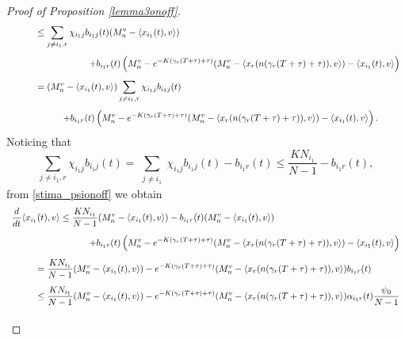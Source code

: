 \documentclass[11pt]{article}
\begin{document}
\begin{proof}[Proof of Proposition \ref{lemma3onoff}]
$$\begin{array}{l}
			\vspace{0.3cm}\displaystyle{\hspace{1cm}\leq \sum_{j \neq i_1 ,r} \chi_{i_1j} b_{i_1j}(t)( M_{n}^v-\langle x_{i_1}(t),v\rangle)}\\
			\vspace{0.3cm}\displaystyle{\hspace{3cm}+b_{i_1r}(t)\left(M_n^v-e^{-K(\gamma_r(T+\tau)+\tau)}(M_n^v-\langle x_r(n(\gamma_r(T+\tau)+\tau)),v \rangle)-\langle x_{i_1}(t),v\rangle\right)}\\
			\vspace{0.3cm}\displaystyle{\hspace{1cm}=( M_{n}^v-\langle x_{i_1}(t),v\rangle)\sum_{j \neq i_1 , r} \chi_{i_1j} b_{i_1j}(t)}\\
			\displaystyle{\hspace{2cm}+ b_{i_1 r}(t)\left(M_n^v-e^{-K(\gamma_r(T+\tau)+\tau)}(M_n^v-\langle x_r(n(\gamma_r(T+\tau)+\tau)),v \rangle)-\langle x_{i_1}(t),v\rangle\right).}
		\end{array}$$
		Noticing that
		$$\sum_{j \neq i_1 ,r} \chi_{i_1j} b_{i_1j}(t)=\sum_{\substack{j \neq i_1 }} \chi_{i_1j} b_{i_1j}(t)-b_{i_1r}(t)\leq \frac{KN_{i_1}}{N-1}-b_{i_1r}(t),$$
		from \eqref{stima_psionoff} we obtain
		$$\begin{array}{l}
			\vspace{0.3cm}\displaystyle{\frac{d}{d t}  \langle x_{i_1}(t),v\rangle \leq \frac{KN_{i_{1}}}{N-1}(M_{n}^v-\langle x_{i_1}(t),v\rangle) -b_{i_1r}(t)(M_{n}^v-\langle x_{i_1}(t),v\rangle) }\\
			\vspace{0.3cm}\displaystyle{\hspace{3cm}+ b_{i_1r}(t)\left(M_n^v-e^{-K(\gamma_r(T+\tau)+\tau)}(M_n^v-\langle x_r(n(\gamma_r(T+\tau)+\tau)),v \rangle)-\langle x_{i_1}(t),v\rangle\right)}\\
			\vspace{0.3cm}\displaystyle{\hspace{1cm}=\frac{KN_{i_{1}}}{N-1}(M_{n}^v-\langle x_{i_1}(t),v\rangle) -e^{-K(\gamma_r(T+\tau)+\tau)}(M_n^v-\langle x_r(n(\gamma_r(T+\tau)+\tau)),v \rangle)b_{i_1r}(t)}\\
			\vspace{0.3cm}\displaystyle{\hspace{1cm}\leq \frac{KN_{i_{1}}}{N-1}(M_{n}^v-\langle x_{i_1}(t),v\rangle) -e^{-K(\gamma_r(T+\tau)+\tau)}(M_n^v-\langle x_r(n(\gamma_r(T+\tau)+\tau)),v \rangle)\alpha_{i_1r}(t)\frac{\psi_{0}}{N-1}}\\

\end{array}$$
\end{proof}
\end{document}
